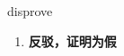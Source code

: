 
\begin{frame}
{\huge disprove}
\begin{center}
\begin{enumerate}\Large
  \item \textbf{反驳，证明为假}
\end{enumerate}
\end{center}
\end{frame}
